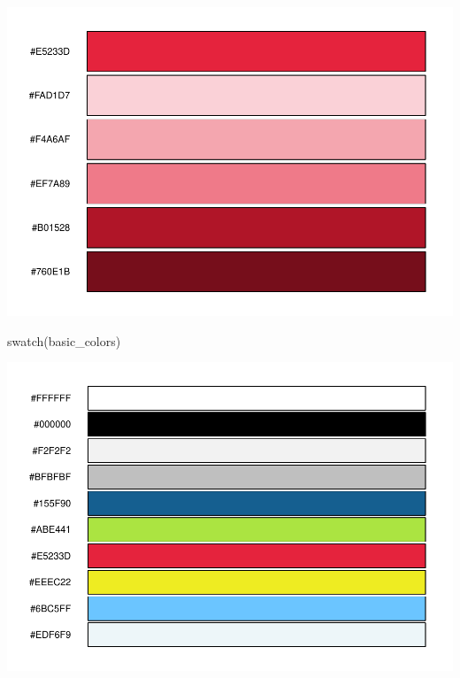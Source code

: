 \documentclass[
]{article}
\newenvironment{Shaded}{\begin{snugshade}}{\end{snugshade}}
\newcommand{\DecValTok}[1]{\textcolor[rgb]{0.00,0.00,0.81}{#1}}
\newcommand{\FunctionTok}[1]{\textcolor[rgb]{0.00,0.00,0.00}{#1}}
\newcommand{\NormalTok}[1]{#1}
\newcommand{\OtherTok}[1]{\textcolor[rgb]{0.56,0.35,0.01}{#1}}
\newcommand{\SpecialCharTok}[1]{\textcolor[rgb]{0.00,0.00,0.00}{#1}}
\begin{document}
\begin{Shaded}
\end{Shaded}

\includegraphics[width=1\linewidth]{man/figures/README-unnamed-chunk-2-3}

\begin{Shaded}
\begin{Highlighting}[]
\FunctionTok{swatch}\NormalTok{(basic\_colors)}
\end{Highlighting}
\end{Shaded}

\includegraphics[width=1\linewidth]{man/figures/README-unnamed-chunk-2-4}
\end{document}
